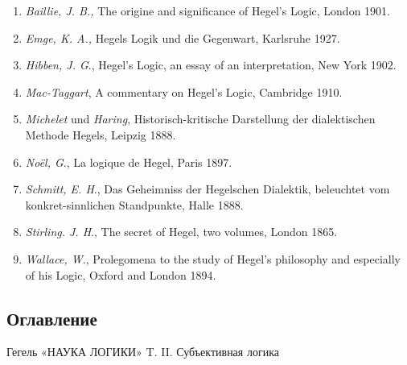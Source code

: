 \documentclass[twoside]{article}
\begin{document}
\begin{enumerate}
\item 
{\em Baillie, J. B.,} The origine and significance of Hegel's Logic, 
London 1901.
\item 
{\em Emge, K. A.,} Hegels Logik und die Gegenwart, Karlsruhe 1927.
\item 
{\em Hibben, J. G}., Hegel's Logic, an essay of an interpretation, 
New York 1902.
\item 
{\em Mac-Taggart}, A commentary on Hegel's Logic, Cambridge 1910.
\item 
{\em Michelet} und {\em Haring}, Historisch-kritische Darstellung 
der dialektischen Methode Hegels, Leipzig 1888.
\item 
{\em Noël, G}., La logique de Hegel, Paris 1897.
\item 
{\em Schmitt, E. H}., Das Geheimniss der Hegelschen Dialektik, beleuchtet 
vom konkret-sinnlichen Standpunkte, Halle 1888.
\item 
{\em Stirling. J. H}., The secret of Hegel, two volumes, London 1865.
\item 
{\em Wallace, W}., Prolegomena to the study of Hegel's philosophy and 
especially of his Logic, Oxford and London 1894.
\end{enumerate}

\clearpage
\bigskip
\subsection[Оглавление]{Оглавление}
\printpagenotes
\bigskip
\bigskip

{\centering Гегель «НАУКА ЛОГИКИ» T. II. Субъективная логика \par}

\renewcommand\contentsname{}
\tableofcontents

\bigskip

\clearpage
\bigskip
\end{document}

